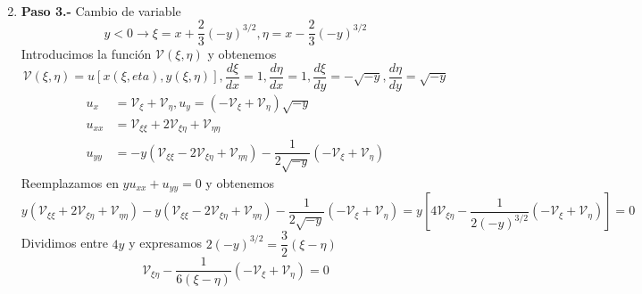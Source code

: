 \documentclass[../main]{subfiles}
\begin{document}
\begin{enumerate}
\begin{enumerate}[label=(\alph*)]
\begin{align*}
        \end{align*}
    \end{enumerate}
    \item[] \textbf{Paso 3.-} Cambio de variable
    $$y<0 \rightarrow \xi=x+\dfrac{2}{3}(-y)^{3/2}, \eta=x-\dfrac{2}{3}(-y)^{3/2}$$
    Introducimos la función $\mathcal{V}(\xi, \eta)$ y obtenemos
    $$\mathcal{V}(\xi, \eta)=u[x(\xi, eta), y(\xi, \eta)], \dfrac{d\xi}{dx}=1, \dfrac{d\eta}{dx}=1, \dfrac{d\xi}{dy}=-\sqrt{-y}, \dfrac{d\eta}{dy}=\sqrt{-y}$$
    \begin{align*}
        u_{x}&=\mathcal{V}_{\xi}+\mathcal{V}_{\eta}, u_y=\left(-\mathcal{V}_{\xi}+\mathcal{V}_{\eta}\right)\sqrt{-y}\\
        u_{xx}&=\mathcal{V}_{\xi\xi}+2\mathcal{V}_{\xi\eta}+\mathcal{V}_{\eta\eta}\\
        u_{yy}&=-y\left( \mathcal{V}_{\xi\xi}-2\mathcal{V}_{\xi\eta}+\mathcal{V}_{\eta\eta}\right)-\dfrac{1}{2\sqrt{-y}}\left(-\mathcal{V}_{\xi}+\mathcal{V}_{\eta}\right)
    \end{align*}
    Reemplazamos en $yu_{xx}+u_{yy}=0$ y obtenemos
    $$y(\mathcal{V}_{\xi\xi}+2\mathcal{V}_{\xi\eta}+\mathcal{V}_{\eta\eta})-y(\mathcal{V}_{\xi\xi}-2\mathcal{V}_{\xi\eta}+\mathcal{V}_{\eta\eta})-\dfrac{1}{2\sqrt{-y}}(-\mathcal{V}_{\xi}+\mathcal{V}_{\eta})=y\left[4\mathcal{V}_{\xi\eta}-\dfrac{1}{2(-y)^{3/2}}(-\mathcal{V}_{\xi}+\mathcal{V}_{\eta})\right]=0$$
    Dividimos entre $4y$ y expresamos $2(-y)^{3/2}=\dfrac{3}{2}(\xi-\eta)$
    $$\mathcal{V}_{\xi\eta}-\dfrac{1}{6(\xi-\eta)}(-\mathcal{V}_{\xi}+\mathcal{V}_{\eta})=0$$
\end{enumerate}
\end{document}
